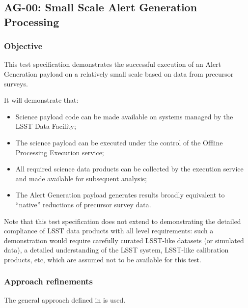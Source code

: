 \subsection{AG-00: Small Scale Alert Generation Processing}
\label{ag-00}

\subsubsection{Objective}

This test specification demonstrates the successful execution of an
Alert Generation payload on a relatively small scale based on data from
precursor surveys.

It will demonstrate that:

\begin{itemize}

  \item{Science payload code can be made available on systems managed by the
  LSST Data Facility;}

  \item{The science payload can be executed under the
  control of the Offline Processing Execution service;}

  \item{All required science data products can be collected by the execution
  service and made available for subsequent analysis;}

  \item{The Alert Generation payload generates results broadly
  equivalent to ``native'' reductions of precursor survey data.}

\end{itemize}

Note that this test specification does not extend to demonstrating the
detailed compliance of LSST data products with all  level requirements: such a demonstration would
require carefully curated LSST-like datasets (or simulated data), a detailed
understanding of the LSST system, LSST-like calibration products, etc, which
are assumed not to be available for this test.

\subsubsection{Approach refinements}

The general approach defined in  is used.

